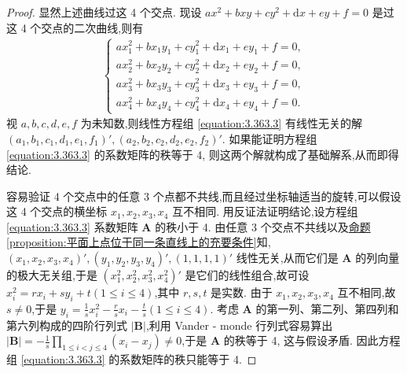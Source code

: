 \documentclass[../../main.tex]{subfiles}
\begin{document}
\begin{proof}
显然上述曲线过这 4 个交点. 现设 \(ax^2 + bxy + cy^2 + \mathrm{d}x + ey + f = 0\) 是过这 4 个交点的二次曲线,则有
\begin{align}\label{equation:3.363.3}
\begin{cases}
ax_1^2 + bx_1y_1 + cy_1^2 + \mathrm{d}x_1 + ey_1 + f = 0,\\
ax_2^2 + bx_2y_2 + cy_2^2 + \mathrm{d}x_2 + ey_2 + f = 0,\\
ax_3^2 + bx_3y_3 + cy_3^2 + \mathrm{d}x_3 + ey_3 + f = 0,\\
ax_4^2 + bx_4y_4 + cy_4^2 + \mathrm{d}x_4 + ey_4 + f = 0.
\end{cases}
\end{align}
视 \(a,b,c,d,e,f\) 为未知数,则线性方程组 \eqref{equation:3.363.3} 有线性无关的解 \((a_1,b_1,c_1,d_1,e_1,f_1)',(a_2,b_2,c_2,d_2,e_2,f_2)'\). 如果能证明方程组 \eqref{equation:3.363.3} 的系数矩阵的秩等于 4, 则这两个解就构成了基础解系,从而即得结论.

容易验证 4 个交点中的任意 3 个点都不共线,而且经过坐标轴适当的旋转,可以假设这 4 个交点的横坐标 \(x_1,x_2,x_3,x_4\) 互不相同. 用反证法证明结论,设方程组 \eqref{equation:3.363.3} 系数矩阵 \(\boldsymbol{A}\) 的秩小于 4. 由任意 3 个交点不共线以及\hyperref[proposition:平面上点位于同一条直线上的充要条件]{命题\ref{proposition:平面上点位于同一条直线上的充要条件}}知,\((x_1,x_2,x_3,x_4)',(y_1,y_2,y_3,y_4)',(1,1,1,1)'\) 线性无关,从而它们是 \(\boldsymbol{A}\) 的列向量的极大无关组,于是 \((x_1^2,x_2^2,x_3^2,x_4^2)'\) 是它们的线性组合,故可设 \(x_i^2 = rx_i + sy_i + t(1\leqslant  i\leqslant  4)\),其中 \(r,s,t\) 是实数. 由于 \(x_1,x_2,x_3,x_4\) 互不相同,故 \(s\neq 0\),于是 \(y_i = \frac{1}{s}x_i^2 - \frac{r}{s}x_i - \frac{t}{s}(1\leqslant  i\leqslant  4)\). 考虑 \(\boldsymbol{A}\) 的第一列、第二列、第四列和第六列构成的四阶行列式 \(|\boldsymbol{B}|\),利用 Vander - monde 行列式容易算出 \(|\boldsymbol{B}|=-\frac{1}{s}\prod_{1\leqslant  i < j\leqslant  4}(x_i - x_j)\neq 0\),于是 \(\boldsymbol{A}\) 的秩等于 4, 这与假设矛盾. 因此方程组 \eqref{equation:3.363.3} 的系数矩阵的秩只能等于 4.
\end{proof}
\end{document}
